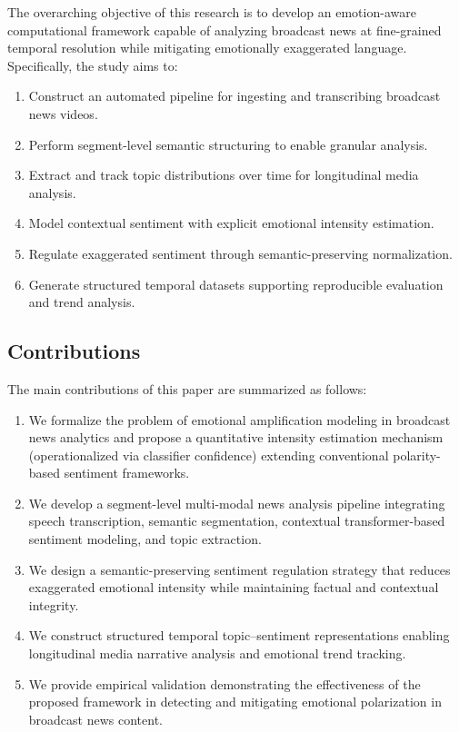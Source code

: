 \documentclass[final,1p,times]{elsarticle}
\begin{document}
The overarching objective of this research is to develop an emotion-aware computational framework capable of analyzing broadcast news at fine-grained temporal resolution while mitigating emotionally exaggerated language. Specifically, the study aims to:
\begin{enumerate}
    \item Construct an automated pipeline for ingesting and transcribing broadcast news videos.
    \item Perform segment-level semantic structuring to enable granular analysis.
    \item Extract and track topic distributions over time for longitudinal media analysis.
    \item Model contextual sentiment with explicit emotional intensity estimation.
    \item Regulate exaggerated sentiment through semantic-preserving normalization.
    \item Generate structured temporal datasets supporting reproducible evaluation and trend analysis.
\end{enumerate}

\subsection{Contributions}

The main contributions of this paper are summarized as follows:
\begin{enumerate}
    \item We formalize the problem of emotional amplification modeling in broadcast news analytics and propose a quantitative intensity estimation mechanism (operationalized via classifier confidence) extending conventional polarity-based sentiment frameworks.
    \item We develop a segment-level multi-modal news analysis pipeline integrating speech transcription, semantic segmentation, contextual transformer-based sentiment modeling, and topic extraction.
    \item We design a semantic-preserving sentiment regulation strategy that reduces exaggerated emotional intensity while maintaining factual and contextual integrity.
    \item We construct structured temporal topic--sentiment representations enabling longitudinal media narrative analysis and emotional trend tracking.
    \item We provide empirical validation demonstrating the effectiveness of the proposed framework in detecting and mitigating emotional polarization in broadcast news content.
\end{enumerate}
\end{document}
